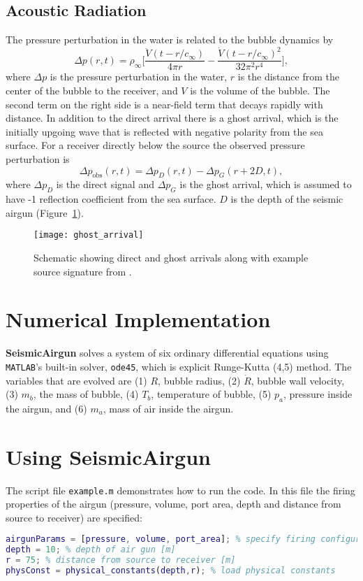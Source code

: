\documentclass[10pt]{article}
\begin{document}
\subsection{Acoustic Radiation}
The pressure perturbation in the water is related to the bubble dynamics by \citep{Keller1956}
\begin{equation}
\Delta p(r,t) = \rho_\infty \bigg[ \frac{\ddot{V}(t-r/c_\infty)}{4\pi r} - \frac{\dot{V}(t-r/c_\infty)^2}{32\pi^2r^4} \bigg],
\label{eq:acoustic radiation}
\end{equation}
where $\Delta p$ is the pressure perturbation in the water, $r$ is the distance from the center of the bubble to the receiver, and $V$ is the volume of the bubble. The second term on the right side is a near-field term that decays rapidly with distance. In addition to the direct arrival there is a ghost arrival, which is the initially upgoing wave that is reflected with negative polarity from the sea surface. For a receiver directly below the source the observed pressure perturbation is
\begin{equation}
\Delta p_\text{obs}(r,t) = \Delta p_D(r,t) - \Delta p_G(r+2D,t),
\end{equation}
where $\Delta p_D$ is the direct signal and $\Delta p_G$ is the ghost arrival, which is assumed to have -1 reflection coefficient from the sea surface. $D$ is the depth of the seismic airgun (Figure~\ref{fig:ghost}).

\begin{figure}[h!]
\centering
\texttt{[image: ghost\_arrival]}
\caption{Schematic showing direct and ghost arrivals along with example source signature from \citet{Watson2016}.}
\label{fig:ghost}
\end{figure}

\section{Numerical Implementation}
{\bf SeismicAirgun} solves a system of six ordinary differential equations using \texttt{MATLAB}'s built-in solver, \texttt{ode45}, which is explicit Runge-Kutta (4,5) method. The variables that are evolved are (1) $R$, bubble radius, (2) $\dot{R}$, bubble wall velocity, (3) $m_b$, the mass of bubble, (4) $T_b$, temperature of bubble, (5) $p_a$, pressure inside the airgun, and (6) $m_a$, mass of air inside the airgun. 

\section{Using {\bf SeismicAirgun}}
The script file \texttt{example.m} demonstrates how to run the code. In this file the firing properties of the airgun (pressure, volume, port area, depth and distance from source to receiver) are specified:
\begin{lstlisting}[language=Matlab]
airgunParams = [pressure, volume, port_area]; % specify firing configuration [psi, in^3, in^2]
depth = 10; % depth of air gun [m]
r = 75; % distance from source to receiver [m]
physConst = physical_constants(depth,r); % load physical constants
\end{lstlisting}
\end{document}
